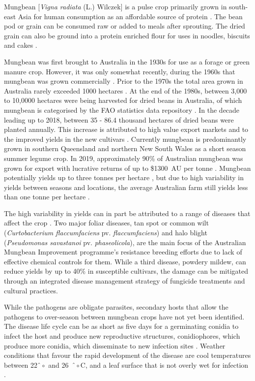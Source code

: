 \documentclass[agronomy,article,submit,moreauthors,pdftex]{mdpi}
\begin{document}

Mungbean {[}\emph{Vigna radiata} (L.) Wilczek{]} is a pulse crop primarily grown in south-east Asia for human consumption as an affordable source of protein \citep{Lambrides2007}.
The bean pod or grain can be consumed raw or added to meals after sprouting.
The dried grain can also be ground into a protein enriched flour for uses in noodles, biscuits and cakes \citep{Chankaew2013}.

Mungbean was first brought to Australia in the 1930s for use as a forage or green manure crop.
However, it was only somewhat recently, during the 1960s that mungbean was grown commercially \citep{Lawn1978, Chauhan2018}.
Prior to the 1970s the total area grown in Australia rarely exceeded 1000 hectares \citep{Lawn1978}.
At the end of the 1980s, between 3,000 to 10,0000 hectares were being harvested for dried beans in Australia, of which mungbean is categorised by the FAO statistics data repository \citep{FAOSTAT}.
In the decade leading up to 2018, between 35 - 86.4 thousand hectares of dried beans were planted annually.
This increase is attributed to high value export markets and to the improved yields in the new cultivars \citep{Clarry2016}.
Currently mungbean is predominantly grown in southern Queensland and northern New South Wales as a short season summer legume crop.
In 2019, approximately 90\% of Australian mungbean was grown for export with lucrative returns of up to \$1300~AU per tonne \citep{QueenslandGovernment2019}.
Mungbean potentially yields up to three tonnes per hectare \citep{ThomasRobert2004}, but due to high variability in yields between seasons and locations, the average Australian farm still yields less than one tonne per hectare \citep{Chauhan2018}.

The high variability in yields can in part be attributed to a range of diseases that affect the crop \citep{Kelly2017a}.
Two major foliar diseases, tan spot or common wilt (\emph{Curtobacterium flaccumfaciens} pv. \emph{flaccumfaciens}) and halo blight (\emph{Pseudomonas savastanoi} pv. \emph{phaseolicola}), are the main focus of the Australian Mungbean Improvement programme's resistance breeding efforts due to lack of effective chemical controls for them.
While a third disease, powdery mildew, can reduce yields by up to 40\% \citep{Chankaew2013} in susceptible cultivars, the damage can be mitigated through an integrated disease management strategy of fungicide treatments and cultural practices.

While the pathogens are obligate parasites, secondary hosts that allow the pathogens to over-season between mungbean crops have not yet been identified.
The disease life cycle can be as short as five days for a germinating conidia to infect the host and produce new reproductive structures, conidiophores, which produce more conidia, which disseminate to new infection sites \citep{Sparks2017}.
Weather conditions that favour the rapid development of the disease are cool temperatures between 22\(ˆ{\circ}\) and 26~\(ˆ{\circ}\)C, and a leaf surface that is not overly wet for infection \citep{Kelly2017a}.
\end{document}
